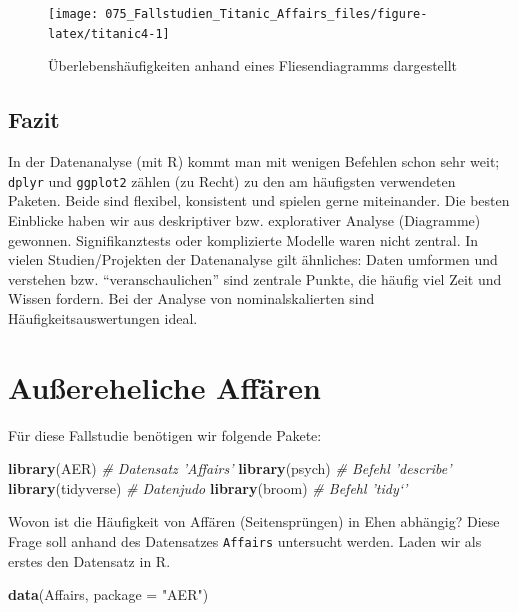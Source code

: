 \documentclass[12pt,ngerman,]{book}
\makeatletter
\newenvironment{Shaded}{\begin{snugshade}}{\end{snugshade}}
\newcommand{\KeywordTok}[1]{\textcolor[rgb]{0.13,0.29,0.53}{\textbf{#1}}}
\newcommand{\DataTypeTok}[1]{\textcolor[rgb]{0.13,0.29,0.53}{#1}}
\newcommand{\StringTok}[1]{\textcolor[rgb]{0.31,0.60,0.02}{#1}}
\newcommand{\CommentTok}[1]{\textcolor[rgb]{0.56,0.35,0.01}{\textit{#1}}}
\newcommand{\NormalTok}[1]{#1}
\newenvironment{kframe}{%
\medskip{}
\setlength{\fboxsep}{.8em}
 \def\at@end@of@kframe{}%
 \ifinner\ifhmode%
  \def\at@end@of@kframe{\end{minipage}}%
  \begin{minipage}{\columnwidth}%
 \fi\fi%
 \def\FrameCommand##1{\hskip\@totalleftmargin \hskip-\fboxsep
 \colorbox{shadecolor}{##1}\hskip-\fboxsep
     \hskip-\linewidth \hskip-\@totalleftmargin \hskip\columnwidth}%
 \MakeFramed {\advance\hsize-\width
   \@totalleftmargin\z@ \linewidth\hsize
   \@setminipage}}%
 {\par\unskip\endMakeFramed%
 \at@end@of@kframe}
\renewenvironment{Shaded}{\begin{kframe}}{\end{kframe}}
\theoremstyle{definition}
\theoremstyle{definition}
\theoremstyle{remark}
\makeatother
\begin{document}
\begin{figure}

{\centering \texttt{[image: 075\_Fallstudien\_Titanic\_Affairs\_files/figure-latex/titanic4-1]} 

}

\caption{Überlebenshäufigkeiten anhand eines Fliesendiagramms dargestellt}\label{fig:titanic4}
\end{figure}

\subsection{Fazit}\label{fazit-1}

In der Datenanalyse (mit R) kommt man mit wenigen Befehlen schon sehr
weit; \texttt{dplyr} und \texttt{ggplot2} zählen (zu Recht) zu den am
häufigsten verwendeten Paketen. Beide sind flexibel, konsistent und
spielen gerne miteinander. Die besten Einblicke haben wir aus
deskriptiver bzw. explorativer Analyse (Diagramme) gewonnen.
Signifikanztests oder komplizierte Modelle waren nicht zentral. In
vielen Studien/Projekten der Datenanalyse gilt ähnliches: Daten umformen
und verstehen bzw. ``veranschaulichen'' sind zentrale Punkte, die häufig
viel Zeit und Wissen fordern. Bei der Analyse von nominalskalierten sind
Häufigkeitsauswertungen ideal.

\section{Außereheliche Affären}\label{auereheliche-affaren}

Für diese Fallstudie benötigen wir folgende Pakete:

\begin{Shaded}
\begin{Highlighting}[]
\KeywordTok{library}\NormalTok{(AER)  }\CommentTok{# Datensatz 'Affairs'}
\KeywordTok{library}\NormalTok{(psych)  }\CommentTok{# Befehl 'describe'}
\KeywordTok{library}\NormalTok{(tidyverse)  }\CommentTok{# Datenjudo}
\KeywordTok{library}\NormalTok{(broom)  }\CommentTok{# Befehl 'tidy`'}
\end{Highlighting}
\end{Shaded}

Wovon ist die Häufigkeit von Affären (Seitensprüngen) in Ehen abhängig?
Diese Frage soll anhand des Datensatzes \texttt{Affairs} untersucht
werden. Laden wir als erstes den Datensatz in R.

\begin{Shaded}
\begin{Highlighting}[]
\KeywordTok{data}\NormalTok{(Affairs, }\DataTypeTok{package =} \StringTok{"AER"}\NormalTok{)}
\end{Highlighting}
\end{Shaded}
\end{document}
